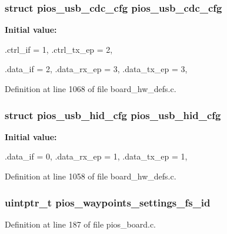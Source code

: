 \hypertarget{group___sparky_ga05cc3e449d417c7f9097d2659e6f5ca3}{
\subsubsection[{pios\-\_\-usb\-\_\-cdc\-\_\-cfg}]{\setlength{\rightskip}{0pt plus 5cm}struct {\bf pios\-\_\-usb\-\_\-cdc\-\_\-cfg} {\bf pios\-\_\-usb\-\_\-cdc\-\_\-cfg}}}\label{group___sparky_ga05cc3e449d417c7f9097d2659e6f5ca3}
{\bfseries \-Initial value\-:}
\begin{DoxyCode}
 {
        .ctrl_if = 1,
        .ctrl_tx_ep = 2,

        .data_if = 2,
        .data_rx_ep = 3,
        .data_tx_ep = 3,
}
\end{DoxyCode}


\-Definition at line 1068 of file board\-\_\-hw\-\_\-defs.\-c.

\hypertarget{group___sparky_ga3665f6d3a2cccc431b55b9432291e94c}{
\subsubsection[{pios\-\_\-usb\-\_\-hid\-\_\-cfg}]{\setlength{\rightskip}{0pt plus 5cm}struct {\bf pios\-\_\-usb\-\_\-hid\-\_\-cfg} {\bf pios\-\_\-usb\-\_\-hid\-\_\-cfg}}}\label{group___sparky_ga3665f6d3a2cccc431b55b9432291e94c}
{\bfseries \-Initial value\-:}
\begin{DoxyCode}
 {
        .data_if = 0,
        .data_rx_ep = 1,
        .data_tx_ep = 1,
}
\end{DoxyCode}


\-Definition at line 1058 of file board\-\_\-hw\-\_\-defs.\-c.

\hypertarget{group___sparky_ga4b04979e5fb31eaa66088178605835cd}{
\subsubsection[{pios\-\_\-waypoints\-\_\-settings\-\_\-fs\-\_\-id}]{\setlength{\rightskip}{0pt plus 5cm}uintptr\-\_\-t {\bf pios\-\_\-waypoints\-\_\-settings\-\_\-fs\-\_\-id}}}\label{group___sparky_ga4b04979e5fb31eaa66088178605835cd}


\-Definition at line 187 of file pios\-\_\-board.\-c.

